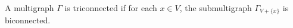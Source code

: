 A multigraph $\Gamma$ is triconnected if for each $x \in V$, the submultigraph $\Gamma_{V+\{x\}}$ is biconnected.

